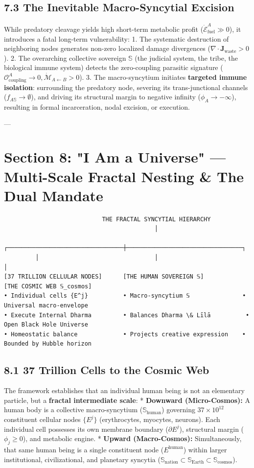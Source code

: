 \documentclass[11pt,a4paper]{article}
\theoremstyle{definition}
\theoremstyle{remark}
\begin{document}
\subsection{7.3 The Inevitable Macro-Syncytial Excision}
While predatory cleavage yields high short-term metabolic profit ($\dot{\mathcal{E}}_{\text{fuel}}^A \gg 0$), it introduces a fatal long-term vulnerability:
1. The systematic destruction of neighboring nodes generates non-zero localized damage divergences ($\nabla \cdot \mathbf{J}_{\text{waste}} > 0$).
2. The overarching collective sovereign $\mathbb{S}$ (the judicial system, the tribe, the biological immune system) detects the zero-coupling parasitic signature ($\mathcal{O}_{\text{coupling}}^A \to 0, \dot{\mathcal{M}}_{A \leftarrow B} > 0$).
3. The macro-syncytium initiates \textbf{targeted immune isolation}: surrounding the predatory node, severing its trans-junctional channels ($f_{A \mathbb{S}} \to \emptyset$), and driving its structural margin to negative infinity ($\phi_A \to -\infty$), resulting in formal incarceration, nodal excision, or execution.

---

\section{Section 8: "I Am a Universe" — Multi-Scale Fractal Nesting \& The Dual Mandate}

\begin{verbatim}
                            THE FRACTAL SYNCYTIAL HIERARCHY
                                           │
         ┌─────────────────────────────────┼─────────────────────────────────┐
         │                                 │                                 │
[37 TRILLION CELLULAR NODES]      [THE HUMAN SOVEREIGN 𝕊]           [THE COSMIC WEB 𝕊_cosmos]
• Individual cells {E^j}          • Macro-syncytium 𝕊               • Universal macro-envelope
• Execute Internal Dharma         • Balances Dharma \& Līlā          • Open Black Hole Universe
• Homeostatic balance             • Projects creative expression    • Bounded by Hubble horizon
\end{verbatim}

\subsection{8.1 37 Trillion Cells to the Cosmic Web}
The framework establishes that an individual human being is not an elementary particle, but a \textbf{fractal intermediate scale}:
* \textbf{Downward (Micro-Cosmos):} A human body is a collective macro-syncytium ($\mathbb{S}_{\text{human}}$) governing $37 \times 10^{12}$ constituent cellular nodes $\{E^j\}$ (erythrocytes, myocytes, neurons). Each individual cell possesses its own membrane boundary ($\partial E^j$), structural margin ($\phi_j \ge 0$), and metabolic engine.
* \textbf{Upward (Macro-Cosmos):} Simultaneously, that same human being is a single constituent node ($E^{\text{human}}$) within larger institutional, civilizational, and planetary syncytia ($\mathbb{S}_{\text{nation}} \subset \mathbb{S}_{\text{Earth}} \subset \mathbb{S}_{\text{cosmos}}$).
\end{document}
